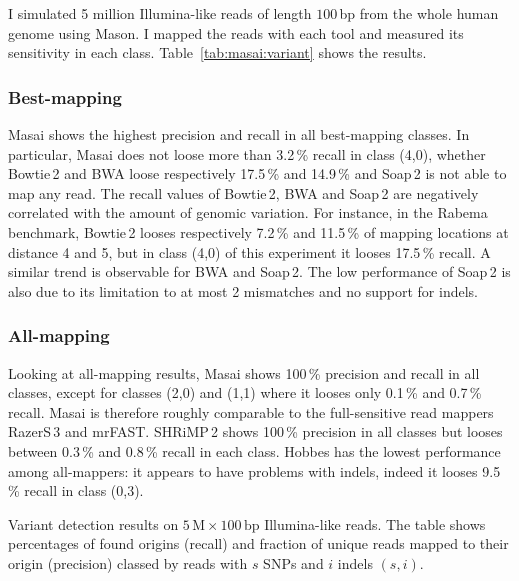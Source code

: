 I simulated 5 million Illumina-like reads of length $100$\,bp from the whole human genome using Mason.
I mapped the reads with each tool and measured its sensitivity in each class.
Table~\ref{tab:masai:variant} shows the results.

\subsubsection{Best-mapping}

Masai shows the highest precision and recall in all best-mapping classes.
In particular, Masai does not loose more than 3.2\,\% recall in class (4,0), whether Bowtie\,2 and BWA loose respectively 17.5\,\% and 14.9\,\% and Soap\,2 is not able to map any read.
The recall values of Bowtie\,2, BWA and Soap\,2 are negatively correlated with the amount of genomic variation.
For instance, in the Rabema benchmark, Bowtie\,2 looses respectively 7.2\,\% and 11.5\,\% of mapping locations at distance 4 and 5, but in class (4,0) of this experiment it looses 17.5\,\% recall.
A similar trend is observable for BWA and Soap\,2.
The low performance of Soap\,2 is also due to its limitation to at most 2 mismatches and no support for indels.

\subsubsection{All-mapping}

Looking at all-mapping results, Masai shows 100\,\% precision and recall in all classes, except for classes (2,0) and (1,1) where it looses only 0.1\,\% and 0.7\,\% recall.
Masai is therefore roughly comparable to the full-sensitive read mappers RazerS\,3 and mrFAST.
SHRiMP\,2 shows 100\,\% precision in all classes but looses between 0.3\,\% and 0.8\,\% recall in each class.
Hobbes has the lowest performance among all-mappers: it appears to have problems with indels, indeed it looses 9.5\,\% recall in class (0,3).

\begin{table*}[tH!]
  \caption[Masai variant detection results]
  {
  \label{tab:masai:variant}
    Variant detection results on $5\,\text{M}\times 100\,\text{bp}$ Illumina-like reads.
    The table shows percentages of found origins (recall) and fraction of unique reads mapped to their origin (precision) classed by reads with $s$ SNPs and $i$ indels $(s,i)$.
  }
  \vspace{-3mm}
  \center
  \sffamily
  \resizebox{0.85\textwidth}{!}
  {
	\renewcommand{\tabcolsep}{0.8ex}
	
  }
\end{table*}

